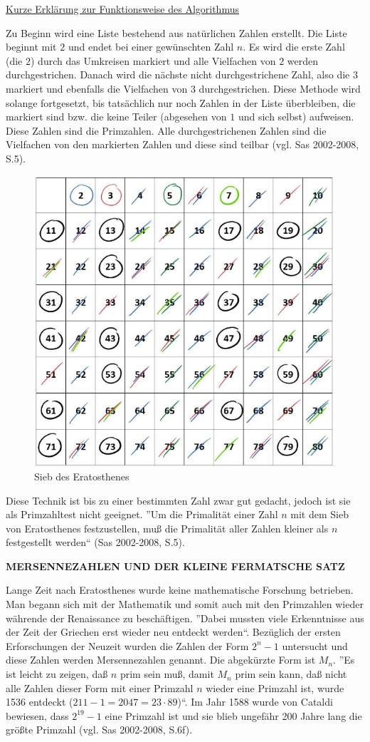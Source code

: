 \underline{Kurze Erklärung zur Funktionsweise des Algorithmus}

Zu Beginn wird eine Liste bestehend aus natürlichen Zahlen
erstellt. Die Liste beginnt mit $2$ und endet bei einer
gewünschten Zahl $n$. Es wird die erste Zahl (die $2$)
durch das Umkreisen markiert und alle Vielfachen von $2$
werden durchgestrichen. Danach wird die nächste nicht
durchgestrichene Zahl, also die $3$ markiert und ebenfalls
die Vielfachen von $3$ durchgestrichen. Diese Methode wird
solange fortgesetzt, bis tatsächlich nur noch Zahlen in der
Liste überbleiben, die markiert sind bzw. die keine Teiler
(abgesehen von $1$ und sich selbst) aufweisen. Diese Zahlen
sind die Primzahlen. Alle durchgestrichenen Zahlen sind die
Vielfachen von den markierten Zahlen und diese sind teilbar
(vgl. Sas 2002-2008, S.5).

\begin{figure}[H]
  \centering
  \includegraphics[width=.5\linewidth]{./images/sieb.jpg}
  \caption[Das Sieb des Eratosthenes, 2021]{Sieb des Eratosthenes}
  \label{fig:sieb_eratosthenes}
\end{figure}
\vspace{.2cm}

Diese Technik ist bis zu einer bestimmten Zahl zwar gut
gedacht, jedoch ist sie als Primzahltest nicht geeignet.
''Um die Primalität einer Zahl $n$ mit dem Sieb von
Eratosthenes festzustellen, muß die Primalität aller
Zahlen kleiner als $n$ festgestellt werden``
(Sas 2002-2008, S.5).
\vspace*{.4cm}

\textbf{MERSENNEZAHLEN UND DER KLEINE FERMATSCHE SATZ}

Lange Zeit nach Eratosthenes wurde keine mathematische
Forschung betrieben. Man begann sich mit der Mathematik
und somit auch mit den Primzahlen wieder währende der 
Renaissance zu beschäftigen. ''Dabei mussten viele
Erkenntnisse aus der Zeit der Griechen erst wieder neu
entdeckt werden``. Bezüglich der ersten Erforschungen
der Neuzeit wurden die Zahlen der Form $2^{n}-1$
untersucht und diese Zahlen werden Mersennezahlen genannt.
Die abgekürzte Form ist $M_n$. ''Es ist leicht zu zeigen,
daß $n$ prim sein muß, damit $M_n$ prim sein kann, daß
nicht alle Zahlen dieser Form mit einer Primzahl $n$
wieder eine Primzahl ist, wurde 1536 entdeckt 
($211 - 1 = 2047 = 23 \cdot 89$)``. Im Jahr 1588 wurde von
Cataldi bewiesen, dass $2^{19} - 1$ eine Primzahl ist
und sie blieb ungefähr 200 Jahre lang die größte Primzahl
(vgl. Sas 2002-2008, S.6f).

